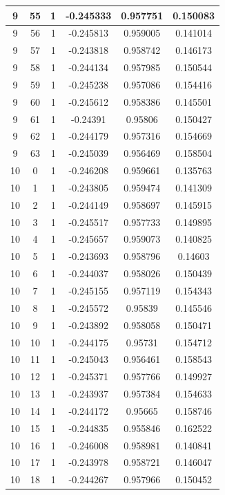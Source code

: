 \documentclass[12pt,a4paper]{article}
\numberwithin{equation}{section}
\numberwithin{figure}{section}
\numberwithin{table}{section}
\begin{document}
\begin{longtable}{|c|c|c|c|c|c|}
9 & 55 & 1 & -0.245333 & 0.957751 & 0.150083 \\ \hline
9 & 56 & 1 & -0.245813 & 0.959005 & 0.141014 \\ \hline
9 & 57 & 1 & -0.243818 & 0.958742 & 0.146173 \\ \hline
9 & 58 & 1 & -0.244134 & 0.957985 & 0.150544 \\ \hline
9 & 59 & 1 & -0.245238 & 0.957086 & 0.154416 \\ \hline
9 & 60 & 1 & -0.245612 & 0.958386 & 0.145501 \\ \hline
9 & 61 & 1 & -0.24391 & 0.95806 & 0.150427 \\ \hline
9 & 62 & 1 & -0.244179 & 0.957316 & 0.154669 \\ \hline
9 & 63 & 1 & -0.245039 & 0.956469 & 0.158504 \\ \hline
10 & 0 & 1 & -0.246208 & 0.959661 & 0.135763 \\ \hline
10 & 1 & 1 & -0.243805 & 0.959474 & 0.141309 \\ \hline
10 & 2 & 1 & -0.244149 & 0.958697 & 0.145915 \\ \hline
10 & 3 & 1 & -0.245517 & 0.957733 & 0.149895 \\ \hline
10 & 4 & 1 & -0.245657 & 0.959073 & 0.140825 \\ \hline
10 & 5 & 1 & -0.243693 & 0.958796 & 0.14603 \\ \hline
10 & 6 & 1 & -0.244037 & 0.958026 & 0.150439 \\ \hline
10 & 7 & 1 & -0.245155 & 0.957119 & 0.154343 \\ \hline
10 & 8 & 1 & -0.245572 & 0.95839 & 0.145546 \\ \hline
10 & 9 & 1 & -0.243892 & 0.958058 & 0.150471 \\ \hline
10 & 10 & 1 & -0.244175 & 0.95731 & 0.154712 \\ \hline
10 & 11 & 1 & -0.245043 & 0.956461 & 0.158543 \\ \hline
10 & 12 & 1 & -0.245371 & 0.957766 & 0.149927 \\ \hline
10 & 13 & 1 & -0.243937 & 0.957384 & 0.154633 \\ \hline
10 & 14 & 1 & -0.244172 & 0.95665 & 0.158746 \\ \hline
10 & 15 & 1 & -0.244835 & 0.955846 & 0.162522 \\ \hline
10 & 16 & 1 & -0.246008 & 0.958981 & 0.140841 \\ \hline
10 & 17 & 1 & -0.243978 & 0.958721 & 0.146047 \\ \hline
10 & 18 & 1 & -0.244267 & 0.957966 & 0.150452 \\ \hline

\end{longtable}
\end{document}

